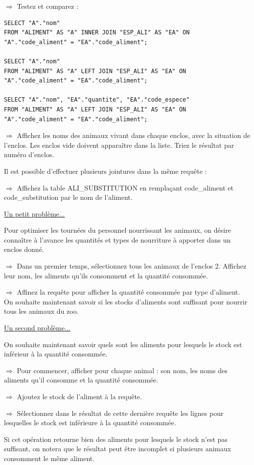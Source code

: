 \documentclass[11pt]{article}
\newcommand{\action}{$\Rightarrow$ }
\begin{document}
\action Testez et comparez :
\begin{lstlisting}
SELECT "A"."nom"
FROM "ALIMENT" AS "A" INNER JOIN "ESP_ALI" AS "EA" ON "A"."code_aliment" = "EA"."code_aliment";

SELECT "A"."nom"
FROM "ALIMENT" AS "A" LEFT JOIN "ESP_ALI" AS "EA" ON "A"."code_aliment" = "EA"."code_aliment";

SELECT "A"."nom", "EA"."quantite", "EA"."code_espece"
FROM "ALIMENT" AS "A" LEFT JOIN "ESP_ALI" AS "EA" ON "A"."code_aliment" = "EA"."code_aliment";
\end{lstlisting}

\action Affichez les noms des animaux vivant dans chaque enclos, avec la situation de l'enclos. Les enclos vide doivent apparaître dans la liste. Triez le résultat par numéro d'enclos.

Il est possible d'effectuer plusieurs jointures dans la même requête :

\action Affichez la table ALI\_SUBSTITUTION en remplaçant code\_aliment et code\_substitution par le nom de l'aliment.

\underline{Un petit problème...}

Pour optimiser les tournées du personnel nourrissant les animaux, on désire connaître à l'avance les quantités et types de nourriture à apporter dans un enclos donné.

\action Dans un premier temps, sélectionnez tous les animaux de l'enclos 2. Affichez leur nom, les aliments qu'ils consomment et la quantité consommée.

\action Affinez la requête pour afficher la quantité consommée par type d'aliment.
On souhaite maintenant savoir si les stocks d'aliments sont suffisant pour nourrir tous les animaux du zoo.

\underline{Un second problème...}

On souhaite maintenant savoir quels sont les aliments pour lesquels le stock est inférieur à la quantité consommée.

\action Pour commencer, afficher pour chaque animal : son nom, les noms des aliments qu'il consomme et la quantité consommée.

\action Ajoutez le stock de l'aliment à la requête.

\action Sélectionnez dans le résultat de cette dernière requête les lignes pour lesquelles le stock est inférieure à la quantité consommée.

Si cet opération retourne bien des aliments pour lesquels le stock n'est pas suffisant, on notera que le résultat peut être incomplet si plusieurs animaux consomment le même aliment.
\end{document}
